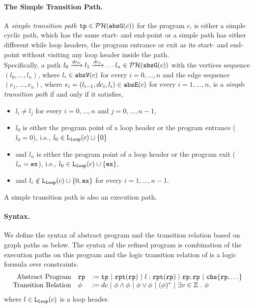   \paragraph{The Simple Transition Path.}
  \begin{defn}
  \label{def:tpath}
A \emph{simple transition path}
$\mathtt{tp} \in \mathcal{PH}(\mathtt{abs}{\mathtt{G}}(c))$ for the program $c$, is either a simple cyclic path, which has the same start- and end-point
or a simple path has either different while loop headers, the program entrance or exit as its start- and end-point
without visiting any loop header inside the path.
\\
Specifically, a path $l_0 \xrightarrow{dc_0} l_1 \xrightarrow{dc_1} \ldots l_n \in \mathcal{PH}(\mathtt{abs}{\mathtt{G}}(c))$ with the
vertices sequence $(l_0, \ldots, l_n)$, where $l_i \in \mathtt{abs}{\mathtt{V}}(c)$ for every $i = 0, \ldots, n$ and
%
the edge sequence $(e_1, \ldots, e_n)$, where $e_i = (l_{i - 1}, dc_i, l_{i}) \in \mathtt{abs}{\mathtt{E}}(c)$ for every $i = 1, \ldots, n$,
%
is a \emph{simple transition path} if and only if it satisfies,
\begin{itemize}
  \item $l_i \neq l_j$ for every $i = 0, \ldots, n$ and $j = 0, \ldots, {n - 1}$,
  \item $l_0$ is either the program point of a loop header or the program entrance ($l_0 = 0$),
  i.e., $l_0 \in \mathtt{L}_{\mathtt{loop}}(c) \cup \{ 0 \}$
  \item and $l_n$ is either the program point of a loop header or the program exit ($l_n = \mathtt{ex}$),
  i.e., $l_0 \in \mathtt{L}_{\mathtt{loop}}(c) \cup \{ \mathtt{ex} \}$,
  \item and $l_i \notin \mathtt{L}_{\mathtt{loop}}(c) \cup \{ 0, \mathtt{ex} \}$ for every $i = 1, \ldots, n-1$.
\end{itemize}
\end{defn}
A simple transition path is also an execution path.

\paragraph{Syntax.}
We define the syntax of abstract program and the transition relation based on graph paths as below. 
The syntax of the refined program is combination of the execution paths on this program and the logic transition relation of is a logic formula over constraints.
\[
  \begin{array}{rll}
   \mbox{Abstract Program} & \rprog &:= \tpath ~|~ \rprepeat(\rprog) ~|~ l : \rprepeat(\rprog) ~|~ \rprog;\rprog ~|~ \rpchoose{\rprog, \ldots} \\
   \mbox{Transition Relation} & \phi & := dc ~|~ \phi \land \phi ~|~ \phi \lor \phi ~|~ (\phi)^* ~|~ \exists v \in \mathbb{Z} \st \phi
  \end{array}
\]
where $l\in \mathtt{L}_{\mathtt{loop}}(c)$ is a loop header.

